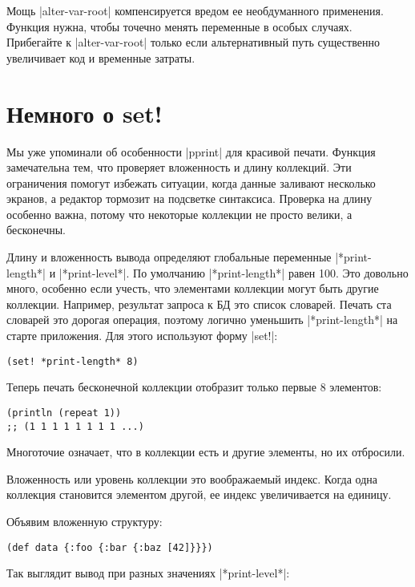 Мощь \spverb|alter-var-root| компенсируется вредом ее необдуманного применения. Функция
нужна, чтобы точечно менять переменные в особых случаях. Прибегайте к
\spverb|alter-var-root| только если альтернативный путь существенно увеличивает код и
временные затраты.

\section{Немного о set!}

Мы уже упоминали об особенности \spverb|pprint| для красивой печати. Функция
замечательна тем, что проверяет вложенность и длину коллекций. Эти ограничения
помогут избежать ситуации, когда данные заливают несколько экранов, а редактор
тормозит на подсветке синтаксиса. Проверка на длину особенно важна, потому что
некоторые коллекции не просто велики, а бесконечны.

Длину и вложенность вывода определяют глобальные переменные \spverb|*print-length*| и
\spverb|*print-level*|. По умолчанию \spverb|*print-length*| равен 100. Это довольно много,
особенно если учесть, что элементами коллекции могут быть другие
коллекции. Например, результат запроса к БД это список словарей. Печать ста
словарей это дорогая операция, поэтому логично уменьшить \spverb|*print-length*| на
старте приложения. Для этого используют форму \spverb|set!|:

\begin{verbatim}
(set! *print-length* 8)
\end{verbatim}

Теперь печать бесконечной коллекции отобразит только первые 8 элементов:

\begin{verbatim}
(println (repeat 1))
;; (1 1 1 1 1 1 1 1 ...)
\end{verbatim}

Многоточие означает, что в коллекции есть и другие элементы, но их отбросили.

Вложенность или уровень коллекции это воображаемый индекс. Когда одна коллекция
становится элементом другой, ее индекс увеличивается на единицу.

Объявим вложенную структуру:

\begin{verbatim}
(def data {:foo {:bar {:baz [42]}}})
\end{verbatim}

Так выглядит вывод при разных значениях \spverb|*print-level*|:

